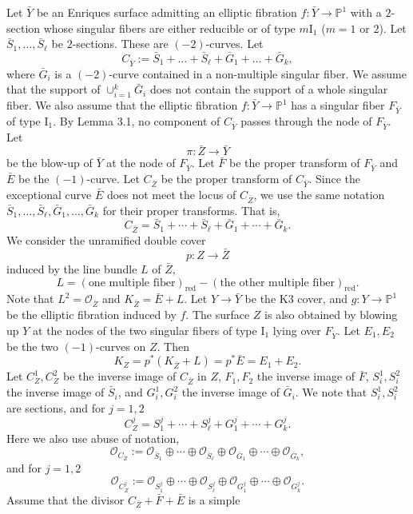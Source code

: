 \documentclass[twoside,11pt]{amsart}
\begin{document}
Let $\bar Y$ be an Enriques surface admitting an elliptic
fibration $f:\bar Y\to{{\mathbb P}}^1$ with a $2$-section whose singular
fibers are either reducible or of type $m\mathrm{I_1}$ ($m=1$ or
2). Let $\bar S_1,\ldots, \bar S_\ell$ be $2$-sections. These are
$(-2)$-curves. Let
$$C_{\bar Y}:=\bar S_1+\ldots + \bar S_\ell+\bar G_1+ \ldots+ \bar
G_k,$$ where $\bar G_i$ is a $(-2)$-curve contained in a
non-multiple singular fiber. We assume that the support of
$\cup_{i=1}^k \bar G_i$ does not contain the support of a whole
singular fiber. We also assume that the elliptic fibration $f:\bar
Y\to{{\mathbb P}}^1$ has a singular fiber $F_{\bar Y}$ of type
$\mathrm{I_1}$. By Lemma 3.1, no component of $C_{\bar Y}$ passes
through the node of $F_{\bar Y}$. Let $$\pi: \bar Z \to \bar Y$$
be the blow-up of $\bar Y$ at the node of $F_{\bar Y}$. Let $\bar
F$ be the proper transform of $F_{\bar Y}$ and $\bar E$ be the
$(-1)$-curve. Let $C_{\bar Z}$ be the proper transform of $C_{\bar
Y}$. Since the exceptional curve $\bar E$ does not meet the locus
of $C_{\bar Z}$, we use the same notation $\bar S_1,\ldots, \bar
S_\ell, \bar G_1, \ldots, \bar G_k$ for their proper transforms.
That is, $$C_{\bar Z}=\bar S_1+\cdots +\bar S_\ell+ \bar G_1+
\cdots+ \bar G_k.$$ We consider the unramified double cover $$p:
Z\to \bar Z$$ induced by the line bundle $L$ of $\bar Z$,
$$L=(\text{one multiple fiber})_{\text{red}}-(\text{the other
multiple fiber})_{\text{red}}.$$ Note that $L^2={{\mathcal O}}_{\bar Z}$ and
$K_{\bar Z}=\bar E+L$. Let $Y\to \bar Y$ be the K3 cover, and
$g:Y\to {{\mathbb P}}^1$ be the elliptic fibration induced by $f$. The
surface $Z$ is also obtained by blowing up $Y$ at the nodes of the
two singular fibers of type $\mathrm{I_1}$ lying over $F_{\bar
Y}$. Let $E_1, E_2$ be the two $(-1)$-curves on $Z$. Then
$$K_Z=p^*(K_{\bar Z}+L)=p^*\bar E=E_1+E_2.$$
Let $C^1_Z, C^2_Z$ be the inverse image of $C_{\bar Z}$ in $Z$,
$F_1, F_2$ the inverse image of $\bar F$, $S_i^1, S_i^2$ the
inverse image of $\bar S_i$, and $G_i^1, G_i^2$ the inverse image
of $\bar G_i$. We note that $S_i^1, S_i^2$ are sections, and  for
$j=1, 2$ $$C^j_Z=S_1^j+\cdots +S_\ell^j+ G_1^j+ \cdots+ G_k^j.$$
Here we also use abuse of notation, $${{\mathcal O}}_{C_{\bar Z}}:={{\mathcal O}}_{\bar
S_1}\oplus\cdots\oplus{{\mathcal O}}_{\bar S_\ell}\oplus{{\mathcal O}}_{\bar G_1}
\oplus\cdots\oplus{{\mathcal O}}_{\bar G_k},$$ and  for $j=1, 2$
$${{\mathcal O}}_{C^j_Z}:={{\mathcal O}}_{S_1^j}\oplus\cdots \oplus
{{\mathcal O}}_{S_\ell^j}\oplus{{\mathcal O}}_{G_1^j}\oplus \cdots \oplus {{\mathcal O}}_{G_k^j}.$$
Assume that the divisor $C_{\bar Z}+\bar F+\bar E$ is a simple
\end{document}
